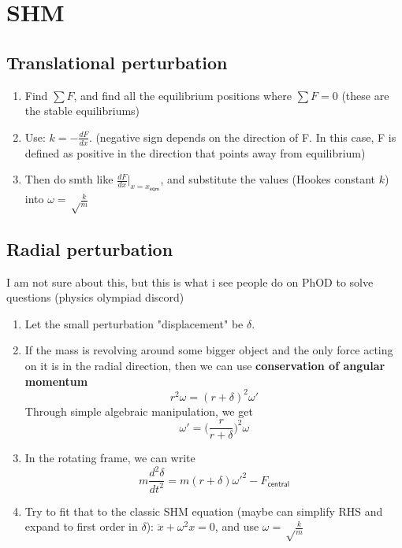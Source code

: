 \section{SHM}
\subsection{Translational perturbation}
\begin{enumerate}
    \item Find $\sum F$, and find all the equilibrium positions where $\sum F=0$ (these are the stable equilibriums)
    \item Use: $k=-\frac{dF}{dx}$. (negative sign depends on the direction of F. In this case, F is defined as positive in the direction that points away from equilibrium)
    \item Then do smth like $\frac{dF}{dx}\big|_{x=x_{\textsf{eqm}}}$, and substitute the values (Hookes constant $k$) into $\omega = \sqrt \frac{k}{m}$
\end{enumerate}

\subsection{Radial perturbation}
I am not sure about this, but this is what i see people do on PhOD to solve questions (physics olympiad discord)
\begin{enumerate}
    \item Let the small perturbation "displacement" be $\delta$.
    \item If the mass is revolving around some bigger object and the only force acting on it is in the radial direction, then we can use \textbf{conservation of angular momentum}
          \begin{equation}
              r^2\omega=(r+\delta)^2\omega'
          \end{equation}
          Through simple algebraic manipulation, we get
          \begin{equation}
              \omega'= \bigg(\frac{r}{r+\delta}\bigg)^2\omega
          \end{equation}
    \item In the rotating frame, we can write
          \begin{equation}
              m \frac{d^2 \delta}{dt^2}= m (r+\delta)\omega'^2-F_{\textsf{central}}
          \end{equation}
    \item Try to fit that to the classic SHM equation (maybe can simplify RHS and expand to first order in $\delta$): $\ddot{x}+\omega^2 x = 0$, and use $\omega = \sqrt \frac{k}{m}$
\end{enumerate}

